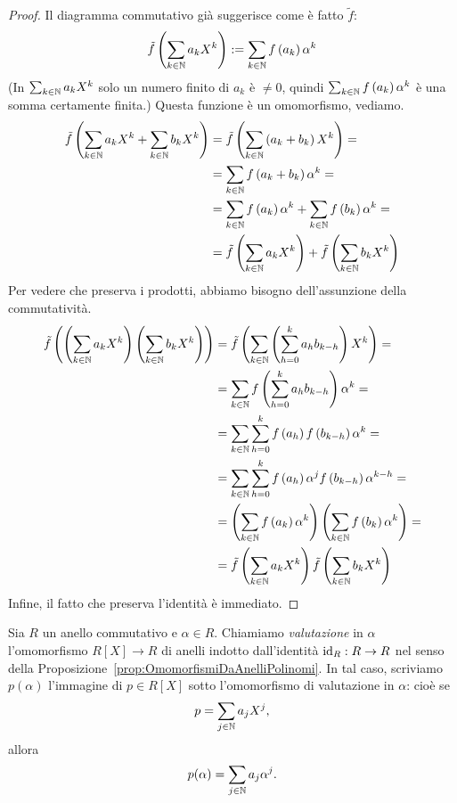 \begin{proof}
Il diagramma commutativo già suggerisce come è fatto \(\tilde f\):
\[\tilde f \left(\sum_{k \in \mathbb{N}} a_kX^k\right) := \sum_{k \in \mathbb{N}} f\left(a_k\right)\alpha^k\]
(In \(\sum_{k \in \mathbb{N}} a_k X^k\) solo un numero finito di \(a_k\) è \(\ne 0\), quindi \(\sum_{k \in \mathbb{N}} f\left(a_k\right) \alpha^k\) è una somma certamente finita.) Questa funzione è un omomorfismo, vediamo.
\begin{align*}
\tilde f \left(\sum_{k \in \mathbb{N}} a_kX^k + \sum_{k \in \mathbb{N}} b_kX^k\right) &= \tilde f \left(\sum_{k \in \mathbb{N}} \left(a_k+b_k\right)X^k\right) =\\
&= \sum_{k \in \mathbb{N}} f\left(a_k+b_k\right)\alpha^k = \\
&= \sum_{k \in \mathbb{N}} f\left(a_k\right)\alpha^k + \sum_{k \in \mathbb{N}} f\left(b_k\right)\alpha^k = \\
&= \tilde f \left(\sum_{k \in \mathbb{N}} a_kX^k\right) + \tilde f \left(\sum_{k \in \mathbb{N}} b_kX^k\right)
\end{align*}
Per vedere che preserva i prodotti, abbiamo bisogno dell'assunzione della commutatività.
\begin{align*}
\tilde f \left(\left(\sum_{k \in \mathbb{N}} a_kX^k\right) \left(\sum_{k \in \mathbb{N}} b_kX^k \right)\right) &= \tilde f \left(\sum_{k \in \mathbb{N}} \left(\sum_{h=0}^k a_hb_{k-h}\right)X^k\right) = \\
&= \sum_{k \in \mathbb{N}} f\left(\sum_{h=0}^k a_hb_{k-h}\right)\alpha^k = \\
&= \sum_{k \in \mathbb{N}} \sum_{h=0}^k f\left(a_h\right) f\left(b_{k-h}\right) \alpha^k = \\
&= \sum_{k \in \mathbb{N}} \sum_{h=0}^k f\left(a_h\right)\alpha^j f\left(b_{k-h}\right)\alpha^{k-h} = \\
&= \left(\sum_{k \in \mathbb{N}} f\left(a_k\right)\alpha^k\right) \left(\sum_{k \in \mathbb{N}} f\left(b_k\right)\alpha^k\right) = \\
&= \tilde f \left(\sum_{k \in \mathbb{N}} a_kX^k\right) \tilde f \left(\sum_{k \in \mathbb{N}} b_kX^k\right)
\end{align*}
Infine, il fatto che preserva l'identità è immediato.
\end{proof}

\begin{defi}\label{prop:ValutazionePolinomi}
Sia \(R\) un anello commutativo e \(\alpha \in R\). Chiamiamo {\em valutazione} in \(\alpha\) l'omomorfismo \(R[X] \to R\) di anelli indotto dall'identità \(\mathrm{id}_R : R \to R\) nel senso della Proposizione~\ref{prop:OmomorfismiDaAnelliPolinomi}. In tal caso, scriviamo \(p(\alpha)\) l'immagine di \(p \in R[X]\) sotto l'omomorfismo di valutazione in \(\alpha\): cioè se 
\[p = \sum_{j \in \mathbb{N}} a_j X^j ,\]
allora
\[p(\alpha) = \sum_{j \in \mathbb{N}} a_j \alpha^j .\]
\end{defi}

